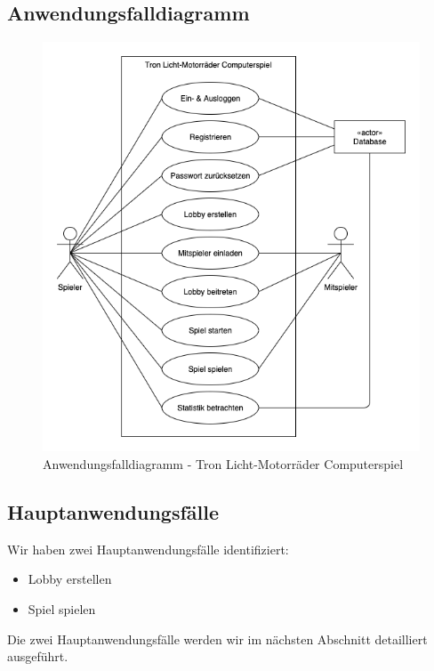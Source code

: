 \documentclass[11pt,ngerman]{article}
\begin{document}
    \subsection{Anwendungsfalldiagramm}
        \begin{figure}[H]
            \includegraphics[scale=0.77]{figures/Use-case-modell.png}
            \caption{Anwendungsfalldiagramm - Tron Licht-Motorräder Computerspiel}
        \end{figure}

    \subsection{Hauptanwendungsfälle}
        Wir haben zwei Hauptanwendungsfälle identifiziert:
         \begin{itemize}
            \item Lobby erstellen
            \item Spiel spielen
        \end{itemize}
        Die zwei Hauptanwendungsfälle werden wir im nächsten Abschnitt detailliert ausgeführt.
\end{document}
